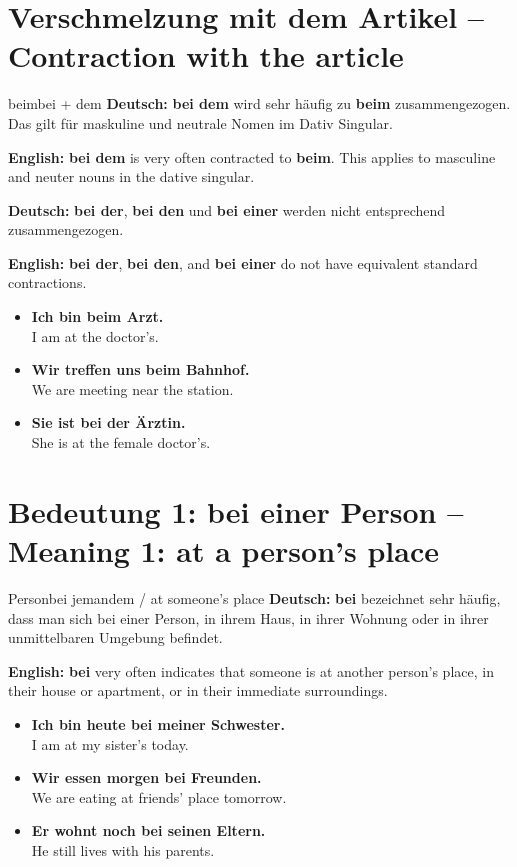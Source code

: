 \documentclass[a4paper,11pt]{article}
\newcommand{\GermanText}[1]{\textbf{Deutsch: }#1\par}
\newcommand{\EnglishText}[1]{{\small\color{SoftGray}\textbf{English: }#1\par}}
\newcommand{\ExampleItem}[2]{\item \textbf{#1}\\{\small\color{SoftGray}#2}}
\begin{document}
   \section{Verschmelzung mit dem Artikel -- Contraction with the article}
      \begin{grammarentry}{beim}{bei + dem}
         \GermanText{\textbf{bei dem} wird sehr häufig zu \textbf{beim} zusammengezogen. Das gilt für maskuline und neutrale Nomen im Dativ Singular.}
         \EnglishText{\textbf{bei dem} is very often contracted to \textbf{beim}. This applies to masculine and neuter nouns in the dative singular.}
         \GermanText{\textbf{bei der}, \textbf{bei den} und \textbf{bei einer} werden nicht entsprechend zusammengezogen.}
         \EnglishText{\textbf{bei der}, \textbf{bei den}, and \textbf{bei einer} do not have equivalent standard contractions.}
      \end{grammarentry}
      \begin{exbox}\begin{itemize}
         \ExampleItem{Ich bin beim Arzt.}{I am at the doctor's.}
         \ExampleItem{Wir treffen uns beim Bahnhof.}{We are meeting near the station.}
         \ExampleItem{Sie ist bei der Ärztin.}{She is at the female doctor's.}
         \end{itemize}\end{exbox}

   \section{Bedeutung 1: bei einer Person -- Meaning 1: at a person's place}
         \begin{grammarentry}{Person}{bei jemandem / at someone's place}
            \GermanText{\textbf{bei} bezeichnet sehr häufig, dass man sich bei einer Person, in ihrem Haus, in ihrer Wohnung oder in ihrer unmittelbaren Umgebung befindet.}
            \EnglishText{\textbf{bei} very often indicates that someone is at another person's place, in their house or apartment, or in their immediate surroundings.}
         \end{grammarentry}
         \begin{exbox}\begin{itemize}
            \ExampleItem{Ich bin heute bei meiner Schwester.}{I am at my sister's today.}
            \ExampleItem{Wir essen morgen bei Freunden.}{We are eating at friends' place tomorrow.}
            \ExampleItem{Er wohnt noch bei seinen Eltern.}{He still lives with his parents.}
            \end{itemize}\end{exbox}
\end{document}
